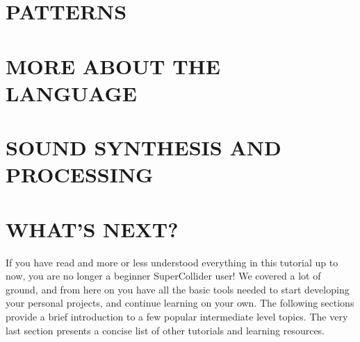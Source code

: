 \documentclass[11pt]{article}
\begin{document}
\part{PATTERNS}



\newpage
\part{MORE ABOUT THE LANGUAGE}








\newpage
\part{SOUND SYNTHESIS AND PROCESSING}



















\newpage
\part{WHAT'S NEXT?}
If you have read and more or less understood everything in this tutorial up to now, you are no longer a beginner SuperCollider user! We covered a lot of ground, and from here on you have all the basic tools needed to start developing your personal projects, and continue learning on your own. The following sections provide a brief introduction to a few popular intermediate level topics. The very last section presents a concise list of other tutorials and learning resources.






\newpage
\theendnotes

\end{document}

